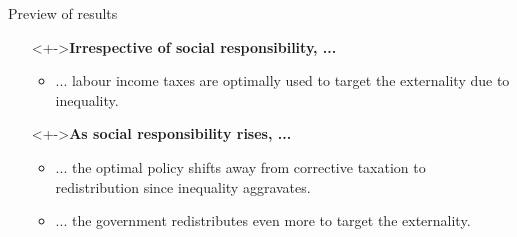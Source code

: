 \documentclass[11pt,aspectratio=169]{beamer}
\begin{document}
	\begin{frame}{Preview of results}
		\hypertarget{backCont}{}
		\vspace{1mm}
		\begin{itemize}
			\item[]<+->\textbf{\alert{Irrespective of social responsibility, ...}}
			\vspace{4mm}
			\begin{itemize}[<+-| alert@+>]
				\item<+-| alert@+>  ... labour income taxes are optimally used to target the externality due to inequality.
								\vspace{3mm}
			\end{itemize}
			
			\item[]<+->\textbf{\alert{As social responsibility rises, ...}}
			\vspace{4mm}
			\begin{itemize}[<+-| alert@+>]
				\item<+-| alert@+>  ... the optimal policy shifts away from corrective taxation to redistribution since inequality aggravates.
				\vspace{3mm}
				\item<+-| alert@+> ... the government redistributes even more to target the externality.

			\end{itemize}
			
			
		\end{itemize}
	\end{frame}
	


		\begin{comment}
	\begin{frame}{Roadmap}
		\tableofcontents
	\end{frame}
	\end{comment}
\end{document}
